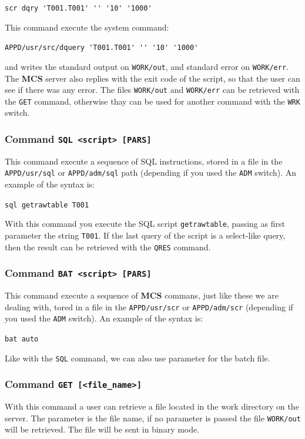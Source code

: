 \documentclass[12pt,titlepage]{book}
\newcommand{\mcs}{\textbf{MCS} }
\begin{document}
\bigskip
\verb|scr dqry 'T001.T001' '' '10' '1000'|
\bigskip

This command execute the system command:

\bigskip
\verb|APPD/usr/src/dquery 'T001.T001' '' '10' '1000'|
\bigskip

and writes the standard output on \verb|WORK/out|, and standard
error on \verb|WORK/err|. The \mcs server also replies with the exit code of
the script, so that the user can see if there was any error. The files
\verb|WORK/out| and \verb|WORK/err| can be retrieved with the \verb|GET|
command, otherwise thay can be used for another command with the \verb|WRK|
switch.

\subsubsection{Command \tt{SQL <script> [PARS]}}
This command execute a sequence of SQL instructions, stored in a file in the
\verb|APPD/usr/sql| or \verb|APPD/adm/sql| path (depending if you used the
\verb|ADM| switch). An example of the syntax is:

\bigskip
\verb|sql getrawtable T001|
\bigskip

With this command you execute the SQL script \verb|getrawtable|, passing as
first parameter the string \verb|T001|. If the last query of the script is a
select-like query, then the result can be retrieved with the \verb|QRES|
command.


\subsubsection{Command \tt{BAT <script> [PARS]}}
This command execute a sequence of \mcs commans, just like these we are
dealing with, tored in a file in the
\verb|APPD/usr/scr| or \verb|APPD/adm/scr| (depending if you used the
\verb|ADM| switch). An example of the syntax is:

\bigskip
\verb|bat auto|
\bigskip

Like with the \verb|SQL| command, we can also use parameter for the batch
file.


\subsubsection{Command \tt{GET [<file\_name>]}}
With this command a user can retrieve a file located in the work directory on
the server. The parameter is the file name, if no parameter is passed the file
\verb|WORK/out| will be retrieved. The file will be sent in binary mode.
\end{document}
